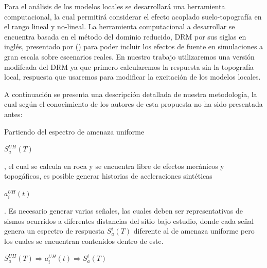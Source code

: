 \documentclass[spanish,letterpaper,12pt,twoside,openany]{article}
\begin{document}
%
Para el análisis de los modelos locales se desarrollará una herramienta computacional, la cual permitirá considerar el efecto acoplado suelo-topografía en el rango lineal y no-lineal. La herramienta computacional a desarrollar se encuentra basada en el método del dominio reducido, DRM por sus siglas en inglés, presentado por \citeauthor{bielak2003} (\citeyear{bielak2003}) para poder incluir los efectos de fuente en simulaciones a gran escala sobre escenarios reales. En nuestro trabajo utilizaremos una versión modifcada del DRM ya que primero calcularemos la respuesta sin la topografía local, respuesta que usaremos para modificar la excitación de los modelos locales.

A continuación se presenta una descripción detallada de nuestra metodología, la cual según el conocimiento de los autores de esta propuesta no ha sido presentada antes:

Partiendo del espectro de amenaza uniforme \begin{large} $S_{a}^{UH} \left( T \right)$ \end{large}, el cual se calcula en roca y se encuentra libre de efectos mecánicos y topogáficos, es posible generar historias de aceleraciones sintéticas \begin{large} $a_{i}^{UH}\left( t \right)$ \end{large}. Es necesario generar varias señales, las cuales deben ser representativas de sismos ocurridos a diferentes distancias del sitio bajo estudio, donde cada señal genera un espectro de respuesta $S_{a}^{i} \left( T \right)$ diferente al de amenaza uniforme pero los cuales se encuentran contenidos dentro de este.

\begin{large}
	$S_{a}^{UH} \left( T \right) \Rightarrow a_{i}^{UH}\left( t \right) \Rightarrow S_{a}^{i} \left( T \right)$
\end{large}
\end{document}

